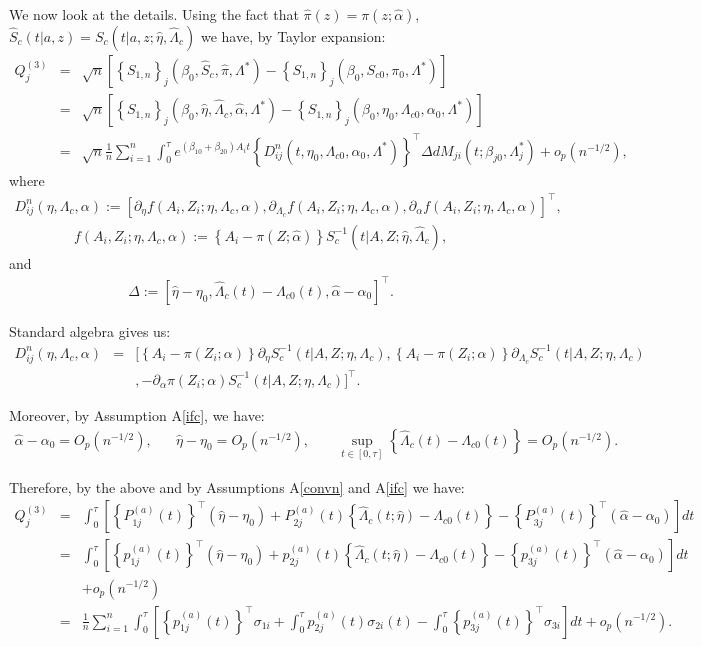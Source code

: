 \documentclass[11pt]{article}
\newcommand{\ee}{\end{eqnarray}}
\newcommand{\eqnn}{\begin{eqnarray*}}
\newcommand{\een}{\end{eqnarray*}}
\newcommand{\be}{\begin{eqnarray}}
\begin{document}
We now look at the details.
Using the fact that $\hat\pi(z)=\pi(z ; \hat\alpha)$, $\hat S_c(t | a,z)=S_c(t | a,z ; \hat \eta, \hat \Lambda_c)$ we have, by Taylor expansion:
\be%
Q^{(3)}_j&=&\sqrt{n}\left[\left\{{S}_{1,n}\right\}_j(\beta_0, \hat S_c,  \hat \pi,   \Lambda^{*})-\left\{{S}_{1,n}\right\}_j(\beta_0, S_{c0}, \pi_0,\Lambda^{*})\right] \nonumber\\
&=&\sqrt{n}\left[\left\{{S}_{1,n}\right\}_j(\beta_0, \hat\eta, \hat \Lambda_{c},  \hat \alpha,  \Lambda^{*})-\left\{{S}_{1,n}\right\}_j(\beta_0, \eta_0, \Lambda_{c0}, \alpha_0, \Lambda^{*})\right]\nonumber\\
&=&\sqrt{n}\frac{1}{n}\sum_{i=1}^n\int_0^\tau e^{(\beta_{10}+\beta_{20})A_it}\left\{{D}_{ij}^n(t,\eta_{0}, \Lambda_{c0}, \alpha_0, \Lambda^{*})\right\}^\top{\Delta} dM_{ji}(t; \beta_{j0}, \Lambda^{*}_j)+o_p(n^{-1/2}),\nonumber
\ee
where
\eqnn
{D}_{ij}^n(\eta,\Lambda_{c},\alpha):=[\partial_{\eta} f (A_i,Z_i;\eta,\Lambda_{c},\alpha),
\partial_{\Lambda_{c}} f(A_i,Z_i;\eta,\Lambda_{c},\alpha),
\partial_\alpha f(A_i,Z_i;\eta,\Lambda_{c},\alpha)]^\top,
\een
\eqnn
f (A_i,Z_i; \eta,\Lambda_{c},\alpha):=\left\{A_i-\pi(Z ; \hat\alpha)\right\}S_c^{-1}(t | A,Z ; \hat \eta, \hat \Lambda_c),\een
and 
\eqnn
{\Delta}:=[ \hat\eta-\eta_0,
\hat\Lambda_{c}(t)-\Lambda_{c0}(t),
\hat\alpha-\alpha_0]^\top.
\een

Standard algebra gives us:
\eqnn
{D}_{ij}^n(\eta,\Lambda_{c},\alpha)&=&[\left\{A_i-\pi(Z_i ; \alpha)\right\}\partial_{\eta}S_c^{-1}(t | A,Z ; \eta, \Lambda_c),
\left\{A_i-\pi(Z_i ; \alpha)\right\}\partial_{\Lambda_c}S_c^{-1}(t | A,Z ; \eta, \Lambda_c)\\&&,
-\partial_\alpha \pi(Z_i ; \alpha)S_c^{-1}(t | A,Z ; \eta, \Lambda_c)
]^\top.
\een

Moreover, by Assumption A\ref{ifc}, we have:
\eqnn
\hat \alpha-\alpha_0=O_p(n^{-1/2}),\;\;\;\;\;\;\hat \eta-\eta_0=O_p(n^{-1/2}),\;\;\;\;\;\;\;\sup_{t \in [0,\tau]} \left\{\hat\Lambda_{c}(t)-\Lambda_{c0}(t)\right\}=O_p(n^{-1/2}).
\een

Therefore, by the above and by Assumptions A\ref{convn} and A\ref{ifc} we have:
\be%
Q^{(3)}_j&=&\int_0^\tau \left[\left\{P^{(a)}_{1j}(t)\right\}^\top (\hat\eta-\eta_0)+ P^{(a)}_{2j}(t) \left\{\hat\Lambda_{c}(t;  \hat \eta)-\Lambda_{c0}(t)\right\}- \left\{P^{(a)}_{3j}(t)\right\}^\top (\hat\alpha-\alpha_0)\right]dt\nonumber\nonumber\\
&=&\int_0^\tau \left[\left\{p^{(a)}_{1j}(t)\right\}^\top (\hat\eta-\eta_0)+ p^{(a)}_{2j}(t) \left\{\hat\Lambda_{c}(t;  \hat \eta)-\Lambda_{c0}(t)\right\}- \left\{p^{(a)}_{3j}(t)\right\}^\top (\hat\alpha-\alpha_0)\right]dt\nonumber\nonumber\\
&&+o_p(n^{-1/2})\nonumber\\
&=& \frac{1}{n}\sum_{i=1}^n\int_0^\tau \left[\left\{p^{(a)}_{1j}(t)\right\}^\top \sigma_{1i}+\int_0^\tau p^{(a)}_{2j}(t)  \sigma_{2i}(t)-\int_0^\tau  \left\{p^{(a)}_{3j}(t)\right\}^\top  \sigma_{3i}  \right]dt+o_p(n^{-1/2}).\nonumber
\ee
\end{document}
